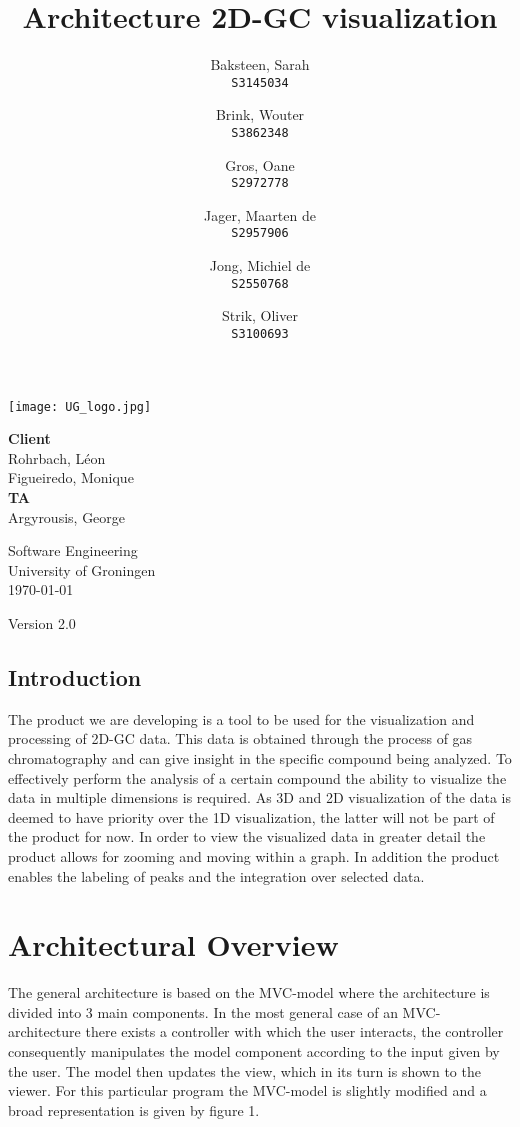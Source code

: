 \documentclass{article}
\title{Architecture 2D-GC visualization}
\author{
  Baksteen, Sarah\\
  \texttt{S3145034}
  \and
  Brink, Wouter\\
  \texttt{S3862348}
  \and
  Gros, Oane\\
  \texttt{S2972778}
  \and
  Jager, Maarten de \\
  \texttt{S2957906}
  \and
  Jong, Michiel de \\
  \texttt{S2550768}
  \and
  Strik, Oliver\\
  \texttt{S3100693}
}
\date{}
\begin{document}
\clearpage
\maketitle
\thispagestyle{empty}
\begin{center}
    \vfill
    \texttt{[image: UG\_logo.jpg]}
    \vfill
    
    \Large
    \textbf{Client} \\
    Rohrbach, Léon \\
    Figueiredo, Monique \\
    
    \vspace{1cm}
    \textbf{TA} \\
    Argyrousis, George
    
    \vspace{2cm}
        Software Engineering \\
        University of Groningen \\
        \today \\
        \empty
        
        \vspace{1cm}
        Version 2.0
\end{center}

\newpage\setcounter{page}{1}
\subsection*{Introduction}

The product we are developing is a tool to be used for the visualization and processing of 2D-GC data. This data is obtained through the process of gas chromatography and can give insight in the specific compound being analyzed. To effectively perform the analysis of a certain compound the ability to visualize the data in multiple dimensions is required. As 3D and 2D visualization of the data is deemed to have priority over the 1D visualization, the latter will not be part of the product for now. In order to view the visualized data in greater detail the product allows for zooming and moving within a graph. In addition the product enables the labeling of peaks and the integration over selected data.

\section*{Architectural Overview}
The general architecture is based on the MVC-model where the architecture is divided into 3 main components. In the most general case of an MVC-architecture there exists a controller with which the user interacts, the controller consequently manipulates the model component according to the input given by the user. The model then updates the view, which in its turn is shown to the viewer. For this particular program the MVC-model is slightly modified and a broad representation is given by figure 1.\\
\end{document}
